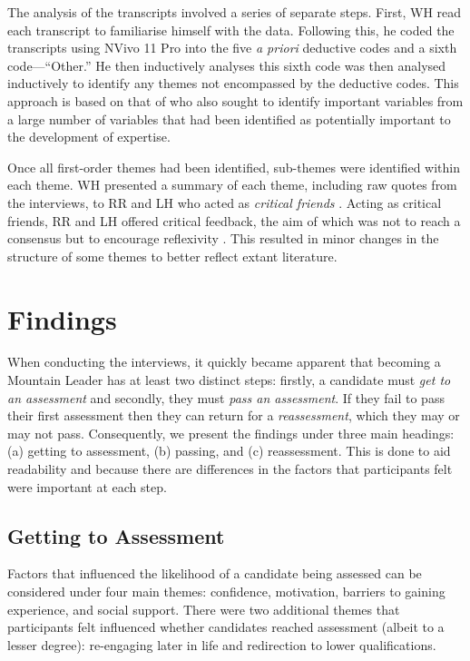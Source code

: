 \documentclass[
  12pt,
  a4paper,
]{book}
\begin{document}
The analysis of the transcripts involved a series of separate steps. First, WH read each transcript to familiarise himself with the data. Following this, he coded the transcripts using NVivo 11 Pro \citep{QSR2017} into the five \emph{a priori} deductive codes and a sixth code---``Other.'' He then inductively analyses this sixth code was then analysed inductively to identify any themes not encompassed by the deductive codes. This approach is based on that of \citet{Hardy2017} who also sought to identify important variables from a large number of variables that had been identified as potentially important to the development of expertise.

Once all first-order themes had been identified, sub-themes were identified within each theme. WH presented a summary of each theme, including raw quotes from the interviews, to RR and LH who acted as \emph{critical friends} \citep[cf.~][]{Sparkes2014, Smith2018a}. Acting as critical friends, RR and LH offered critical feedback, the aim of which was not to reach a consensus but to encourage reflexivity \citep{Smith2018a}. This resulted in minor changes in the structure of some themes to better reflect extant literature.

\hypertarget{qual-findings}{%
\section{Findings}\label{qual-findings}}

When conducting the interviews, it quickly became apparent that becoming a Mountain Leader has at least two distinct steps: firstly, a candidate must \emph{get to an assessment} and secondly, they must \emph{pass an assessment}. If they fail to pass their first assessment then they can return for a \emph{reassessment}, which they may or may not pass. Consequently, we present the findings under three main headings: (a) getting to assessment, (b) passing, and (c) reassessment. This is done to aid readability and because there are differences in the factors that participants felt were important at each step.

\hypertarget{qual-gta}{%
\subsection{Getting to Assessment}\label{qual-gta}}

Factors that influenced the likelihood of a candidate being assessed can be considered under four main themes: confidence, motivation, barriers to gaining experience, and social support. There were two additional themes that participants felt influenced whether candidates reached assessment (albeit to a lesser degree): re-engaging later in life and redirection to lower qualifications.
\end{document}
